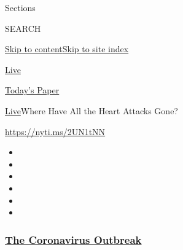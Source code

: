 Sections

SEARCH

\protect\hyperlink{site-content}{Skip to
content}\protect\hyperlink{site-index}{Skip to site index}

\href{https://www.nytimes3xbfgragh.onion/section/well/live}{Live}

\href{https://myaccount.nytimes3xbfgragh.onion/auth/login?response_type=cookie\&client_id=vi}{}

\href{https://www.nytimes3xbfgragh.onion/section/todayspaper}{Today's
Paper}

\href{/section/well/live}{Live}\textbar{}Where Have All the Heart
Attacks Gone?

\url{https://nyti.ms/2UN1tNN}

\begin{itemize}
\item
\item
\item
\item
\item
\item
\end{itemize}

\hypertarget{the-coronavirus-outbreak}{%
\subsubsection{\texorpdfstring{\href{https://www.nytimes3xbfgragh.onion/news-event/coronavirus?name=styln-coronavirus-national\&region=TOP_BANNER\&block=storyline_menu_recirc\&action=click\&pgtype=Article\&impression_id=f3bcfbf0-f4b8-11ea-b9f9-d5e9868d2682\&variant=undefined}{The
Coronavirus
Outbreak}}{The Coronavirus Outbreak}}\label{the-coronavirus-outbreak}}

